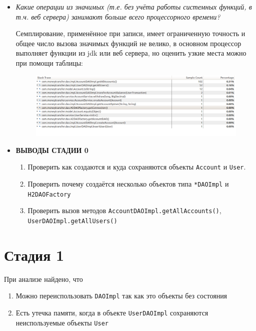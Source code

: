 \documentclass{article}
\begin{document}
\begin{itemize}
		\newpage
		\item \textit{Какие операции из значимых (т.е. без учёта работы системных функций, в т.ч. веб сервера) занимают больше всего процессорного времени?}

		Семплирование, применённое при записи, имеет ограниченную точность и общее число вызова значимых функций не велико, 
		в основном процессор выполняет функции из jdk или веб сервера, но оценить узкие места можно при помощи таблицы: 

		\begin{figure}[h!] %
			\centering
			\includegraphics[width=0.95\linewidth]{img/stage_0/hotmethods.png}
			\label{fig:hotmethods0}
		\end{figure}

		\item \textbf{ВЫВОДЫ СТАДИИ 0}
		\begin{enumerate}
			\item Проверить как создаются и куда сохраняются объекты \texttt{Account} и \texttt{User}.
			\item Проверить почему создаётся несколько объектов типа \texttt{*DAOImpl} и \texttt{H2DAOFactory}
			\item Проверить вызов методов \texttt{AccountDAOImpl.getAllAccounts()}, \texttt{UserDAOImpl.getAllUsers()}
		\end{enumerate}
	\end{itemize}





	\section*{Стадия 1}
		При анализе найдено, что
	\begin{enumerate}
		\item Можно переиспользовать \texttt{DAOImpl} так как это объекты без состояния
		\item Есть утечка памяти, когда в объекте \texttt{UserDAOImpl} сохраняются неиспользуемые объекты \texttt{User}
	\end{enumerate}		
\end{document}
